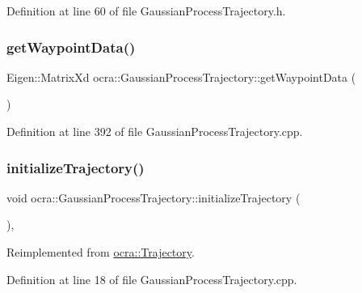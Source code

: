 Definition at line 60 of file Gaussian\+Process\+Trajectory.\+h.

\hypertarget{classocra_1_1GaussianProcessTrajectory_af345fbbe285d7758c7a4bab7d83b0f02}{}\label{classocra_1_1GaussianProcessTrajectory_af345fbbe285d7758c7a4bab7d83b0f02} 
\subsubsection{\texorpdfstring{get\+Waypoint\+Data()}{getWaypointData()}}
{\footnotesize\ttfamily Eigen\+::\+Matrix\+Xd ocra\+::\+Gaussian\+Process\+Trajectory\+::get\+Waypoint\+Data (\begin{DoxyParamCaption}{ }\end{DoxyParamCaption})}



Definition at line 392 of file Gaussian\+Process\+Trajectory.\+cpp.

\hypertarget{classocra_1_1GaussianProcessTrajectory_aee26ead179583530615422b05c5e2081}{}\label{classocra_1_1GaussianProcessTrajectory_aee26ead179583530615422b05c5e2081} 
\subsubsection{\texorpdfstring{initialize\+Trajectory()}{initializeTrajectory()}}
{\footnotesize\ttfamily void ocra\+::\+Gaussian\+Process\+Trajectory\+::initialize\+Trajectory (\begin{DoxyParamCaption}{ }\end{DoxyParamCaption})\hspace{0.3cm}{\ttfamily [protected]}, {\ttfamily [virtual]}}



Reimplemented from \hyperlink{classocra_1_1Trajectory_aa49b123abf79be71f131c138ff2a88b2}{ocra\+::\+Trajectory}.



Definition at line 18 of file Gaussian\+Process\+Trajectory.\+cpp.

